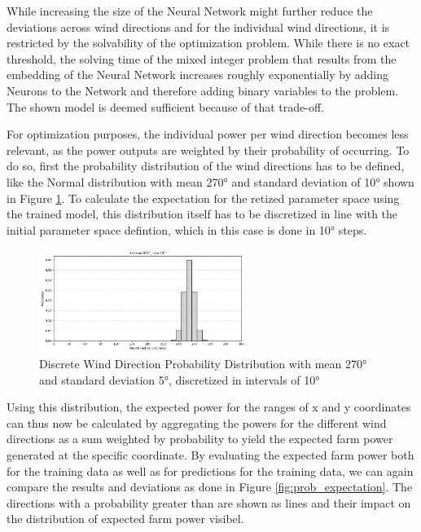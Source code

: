 \documentclass[preprint,12pt]{elsarticle}
\begin{document}
While increasing the size of the Neural Network might further reduce the deviations across wind directions and for the individual wind directions, it is restricted by the solvability of the optimization problem. While there is no exact threshold, the solving time of the mixed integer problem that results from the embedding of the Neural Network increases roughly exponentially by adding Neurons to the Network and therefore adding binary variables to the problem. The shown model is deemed sufficient because of that trade-off.

For optimization purposes, the individual power per wind direction becomes less relevant, as the power outputs are weighted by their probability of occurring. 
To do so, first the probability distribution of the wind directions has to be defined, like the Normal distribution with mean 270° and standard deviation of 10° shown in Figure \ref{fig:wind_dist_opti}. To calculate the expectation for the retized parameter space using the trained model, this distribution itself has to be discretized in line with the initial parameter space defintion, which in this case is done in 10° steps. 


\begin{figure}[h] 
	\centering
	\includegraphics[width=0.6\textwidth]{../figures/optimization/wind_dist_opti.png} 
	\caption{Discrete Wind Direction Probability Distribution with mean 270° and standard deviation 5°, discretized in intervals of 10° }
	\label{fig:wind_dist_opti}
\end{figure}


Using this distribution, the expected power for the ranges of x and y coordinates can thus now be calculated by aggregating the powers for the different wind directions as a sum weighted by probability to yield the expected farm power generated at the specific coordinate. By evaluating the expected farm power both for the training data as well as for predictions for the training data, we can again compare the results and deviations as done in Figure \ref{fig:prob_expectation}. The directions with a probability greater than are shown as lines and their impact on the distribution of expected farm power visibel.
\end{document}
